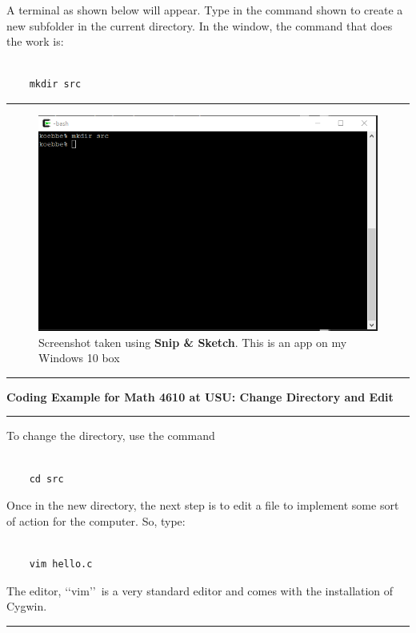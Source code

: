 \documentclass[10pt,fleqn]{article}
\begin{document}
A terminal as shown below will appear. Type in the command shown to create a
new subfolder in the current directory. In the window, the command that does
the work is:
\begin{verbatim}

    mkdir src

\end{verbatim}
\vskip0.1in\hrule\vskip0.1in
\vfill
\begin{figure}[h]
\centering
\includegraphics{../images/coding_01.png}
\caption{{Screenshot} taken using {\bf Snip \& Sketch}. This is an app on
         my Windows 10 box}
\end{figure}
\eject
\vskip0.1in\hrule\vskip0.1in
\noindent
{\bf Coding Example for Math 4610 at USU: Change Directory and Edit} 
\vskip0.1in\hrule\vskip0.1in
\noindent
To change the directory, use the command
\begin{verbatim}

    cd src

\end{verbatim}
Once in the new directory, the next step is to edit a file to implement some
sort of action for the computer. So, type:
\begin{verbatim}

    vim hello.c

\end{verbatim}
The editor, \lq\lq vim\rq\rq\ is a very standard editor and comes with the
installation of Cygwin.
\vskip0.1in\hrule\vskip0.1in
\vfill
\end{document}
